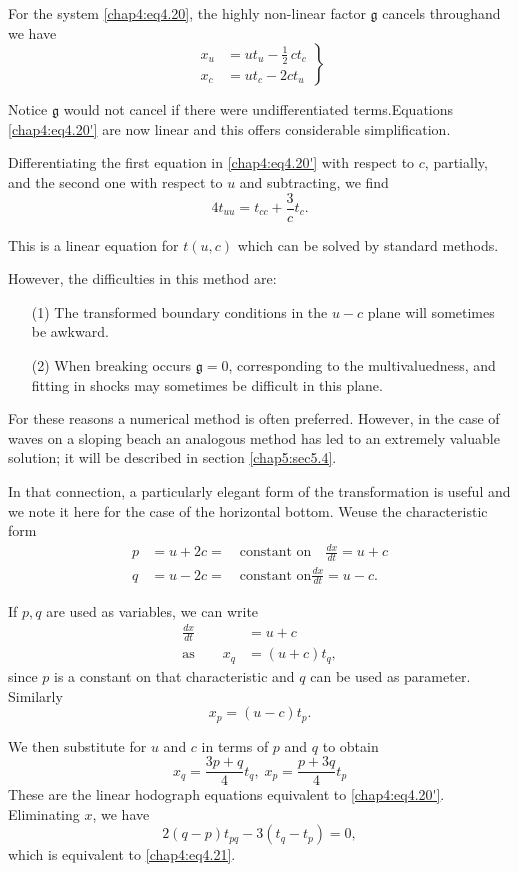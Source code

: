 For the system \eqref{chap4:eq4.20}, the highly non-linear factor $\mathfrak{g}$ cancels through\pageoriginale and we have 
\begin{equation}
\left.
\begin{aligned}
x_u &=ut_u-\frac{1}{2}\,ct_c\\
x_c &=ut_c-2ct_u 
\end{aligned}
\right\}\tag*{$(4.20)'$}\label{chap4:eq4.20'}
\end{equation}

Notice $\mathfrak{g}$ would not cancel if there were undifferentiated
terms.\break Equations \ref{chap4:eq4.20'} are now linear and this offers
considerable simplification. 

Differentiating the first equation in \ref{chap4:eq4.20'} with respect to $c$, partially, and the second one with respect to $u$ and subtracting, we find 
\begin{equation}
4t_{uu}=t_{cc}+\frac{3}{c}t_c.\tag{4.21}\label{chap4:eq4.21}
\end{equation}

This is a linear equation for $t(u,c)$ which can be solved by standard methods.

However, the difficulties in this method are:
\begin{enumerate}
\item [(1)] The transformed boundary conditions in the $u-c$ plane will sometimes be awkward.
\item [(2)] When breaking occurs $\mathfrak{g}=0$, corresponding to the multivaluedness, and fitting in shocks may sometimes be difficult in this plane.
\end{enumerate}
For these reasons a numerical method is often preferred. However, in the case of waves on a sloping beach an analogous method has led to an extremely valuable solution; it will be described in section \ref{chap5:sec5.4}.

In that connection, a particularly elegant form of the transformation is useful and we note it here for the case of the horizontal bottom. We\pageoriginale use the characteristic form 
\begin{align*}
p &= u+2c =\quad\text{constant on}\quad\frac{dx}{dt}=u+c\\
q &=u-2c=\quad\text{constant on}\frac{dx}{dt}=u-c.
\end{align*}

If $p,q$ are used as variables, we can write
\begin{align*}
\frac{dx}{dt}&=u+c\\
\text{as}\qquad x_q &=(u+c)t_q,
\end{align*}
since $p$ is a constant on that characteristic and $q$ can be used as parameter. Similarly
$$
x_p=(u-c)t_p.
$$

We then substitute for $u$ and $c$ in terms of $p$ and $q$ to obtain
$$
x_q=\frac{3p+q}{4}t_q,\; x_p=\frac{p+3q}{4}t_p
$$
These are the linear hodograph equations equivalent to \ref{chap4:eq4.20'}. Eliminating $x$, we have 
$$
2(q-p)t_{pq}-3\left(t_q-t_p\right)=0,
$$
which is equivalent to \eqref{chap4:eq4.21}.





